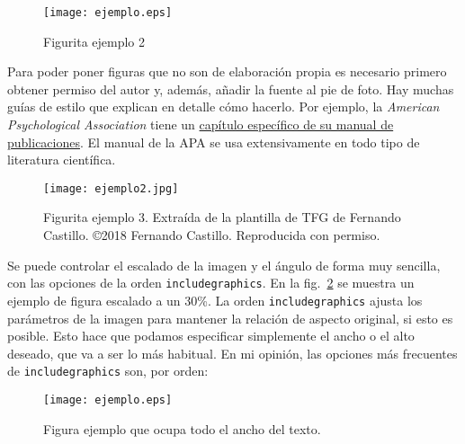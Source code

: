 \begin{figure}[h!]
\centering
\texttt{[image: ejemplo.eps]}
\caption{Figurita ejemplo 2}
\label{fig:figurita-ejemplo-2}
\end{figure}

Para poder poner figuras que no son de elaboración propia es necesario primero obtener permiso del autor y, además, añadir la fuente al pie de foto. Hay muchas guías de estilo que explican en detalle cómo hacerlo. Por ejemplo, la \emph{American Psychological Association} tiene un \href{https://www.lib.sfu.ca/help/research-assistance/format-type/online-images/citing#citing-images-in-apa}{capítulo específico de su manual de publicaciones}.  El manual de la APA se usa extensivamente en todo tipo de literatura científica.

\begin{figure}[htb]
\centering
\texttt{[image: ejemplo2.jpg]}
\caption{Figurita ejemplo 3. Extraída de la plantilla de TFG de Fernando Castillo. \copyright 2018 Fernando Castillo. Reproducida con permiso.}
\label{fig:figura-ejemplo-3}
\end{figure}


Se puede controlar el escalado de la imagen y el ángulo de forma muy sencilla, con las opciones de la orden \texttt{includegraphics}.  En la fig.~\ref{fig:figura-ejemplo-3} se muestra un ejemplo de figura escalado a un 30\%.  La orden \texttt{includegraphics} ajusta los parámetros de la imagen para mantener la relación de aspecto original, si esto es posible.  Esto hace que podamos especificar simplemente el ancho o el alto deseado, que va a ser lo más habitual.  En mi opinión, las opciones más frecuentes de \texttt{includegraphics} son, por orden:

\begin{figure}
\centering
\texttt{[image: ejemplo.eps]}
\caption{Figura ejemplo que ocupa todo el ancho del texto.}
\label{fig:figura-ejemplo-4}
\end{figure}

